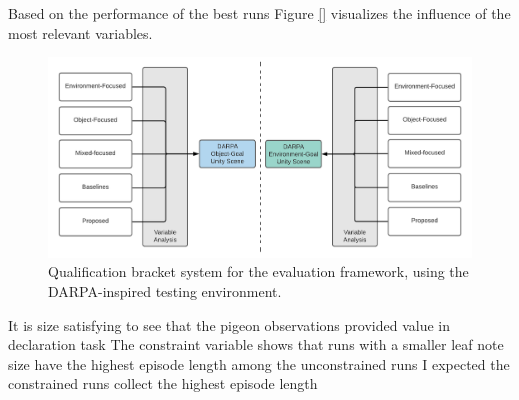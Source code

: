         
        Based on the performance of the best runs Figure \ref{} visualizes the influence of the most relevant variables.
        
        \begin{figure}[!ht]
        \centering
        \includegraphics[width=1\textwidth]{images/darpa-qualification-bracket_2.pdf} 
        \caption{Qualification bracket system for the evaluation framework, using the DARPA-inspired testing environment.}
        \label{fig:darpa-bracket}
            \end{figure}
        
        It is size satisfying to see that the pigeon observations provided value in declaration task
        The constraint variable shows that runs with a smaller leaf note size have the highest episode length among the unconstrained runs
        I expected the constrained runs collect the highest episode length
        
    
        
        
        
